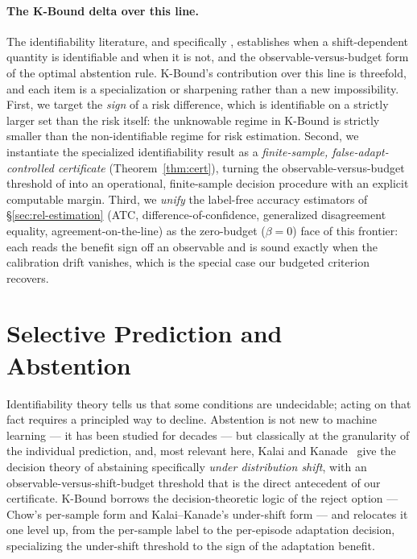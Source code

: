 \paragraph{The K-Bound delta over this line.}
The identifiability literature, and specifically \cite{garg2022atc,kalai2021abstain},
establishes when a shift-dependent quantity is identifiable and when it is not, and
the observable-versus-budget form of the optimal abstention rule. K-Bound's
contribution over this line is threefold, and each item is a specialization or
sharpening rather than a new impossibility.
First, we target the \emph{sign} of a risk difference, which is identifiable
on a strictly larger set than the risk itself: the unknowable regime in
K-Bound is strictly smaller than the non-identifiable regime for risk
estimation.
Second, we instantiate the specialized identifiability result as a
\emph{finite-sample, false-adapt-controlled certificate} (Theorem~\ref{thm:cert}),
turning the observable-versus-budget threshold of \cite{kalai2021abstain} into an
operational, finite-sample decision procedure with an explicit computable margin.
Third, we \emph{unify} the label-free accuracy estimators of
\S\ref{sec:rel-estimation} (ATC, difference-of-confidence, generalized disagreement
equality, agreement-on-the-line) as the zero-budget ($\beta=0$) face of this
frontier: each reads the benefit sign off an observable and is sound exactly when
the calibration drift vanishes, which is the special case our budgeted criterion
recovers.

\section{Selective Prediction and Abstention}\label{sec:rel-selective}

Identifiability theory tells us that some conditions are undecidable; acting on
that fact requires a principled way to decline. Abstention is not new to machine
learning --- it has been studied for decades --- but classically at the granularity
of the individual prediction, and, most relevant here, Kalai and
Kanade~\cite{kalai2021abstain} give the decision theory of abstaining specifically
\emph{under distribution shift}, with an observable-versus-shift-budget threshold
that is the direct antecedent of our certificate. K-Bound borrows the
decision-theoretic logic of the reject option --- Chow's per-sample form and
Kalai--Kanade's under-shift form --- and relocates it one level up, from the
per-sample label to the per-episode adaptation decision, specializing the
under-shift threshold to the sign of the adaptation benefit.

